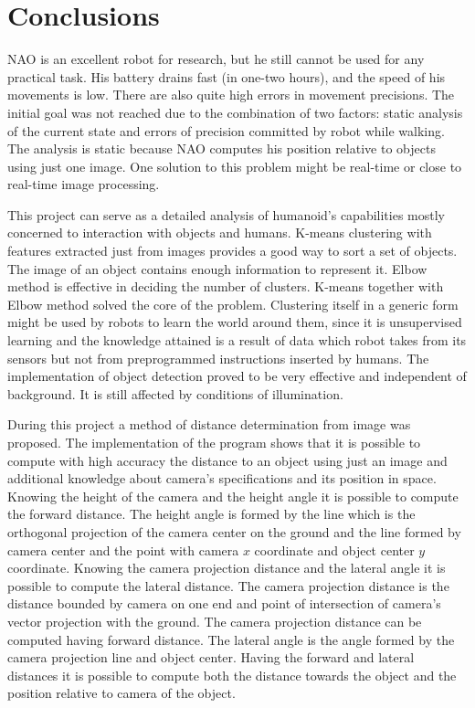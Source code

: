 \section*{Conclusions}


	NAO is an excellent robot for research, but he still cannot be used for any practical task. His battery drains fast (in one-two hours), and the speed of his movements is low. There are also quite high errors in movement precisions. The initial goal was not reached due to the combination of two factors: static analysis of the current state and errors of precision committed by robot while walking. The analysis is static because NAO computes his position relative to objects using just one image. One solution to this problem might be real-time or close to real-time image processing.

	This project can serve as a detailed analysis of humanoid's capabilities mostly concerned to interaction with objects and humans. K-means clustering with features extracted just from images provides a good way to sort a set of objects. The image of an object contains enough information to represent it. Elbow method is effective in deciding the number of clusters. K-means together with Elbow method solved the core of the problem. Clustering itself in a generic form might be used by robots to learn the world around them, since it is unsupervised learning and the knowledge attained is a result of data which robot takes from its sensors but not from preprogrammed instructions inserted by humans. The implementation of object detection proved to be very effective and independent of background. It is still affected by conditions of illumination. 

	During this project a method of distance determination from image was proposed. The implementation of the program shows that it is possible to compute with high accuracy the distance to an object using just an image and additional knowledge about camera's specifications and its position in space. Knowing the height of the camera and the height angle it is possible to compute the forward distance. The height angle is formed by the line which is the orthogonal projection of the camera center on the ground and the line formed by camera center and the point with camera \( x \) coordinate and object center \( y \) coordinate. Knowing the camera projection distance and the lateral angle it is possible to compute the lateral distance. The camera projection distance is the distance bounded by camera on one end and point of intersection of camera's vector projection with the ground. The camera projection distance can be computed having forward distance. The lateral angle is the angle formed by the camera projection line and object center. Having the forward and lateral distances it is possible to compute both the distance towards the object and the position relative to camera of the object.   

